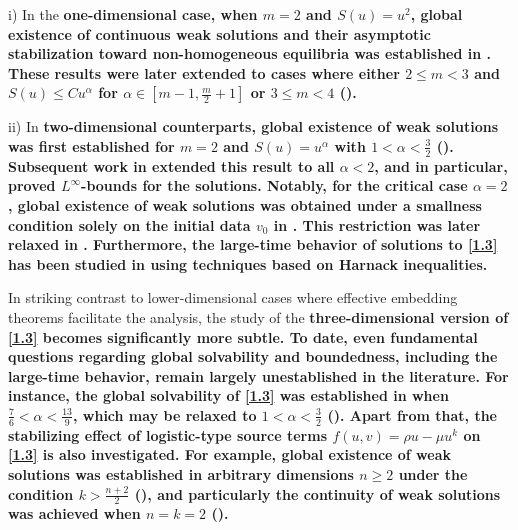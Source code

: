 \documentclass[12pt]{article}
\theoremstyle{plain}
\theoremstyle{definition}
\numberwithin{equation}{section}
\begin{document}
  i)
    In the \bf{one-dimensional} \rm case, when $m=2$ and $S(u)=u^2$, global existence of continuous weak solutions and their asymptotic stabilization toward non-homogeneous equilibria was established in \cite{Winkler3,LiWinkler1}.  These results were later extended to cases where either
    $2\leq m<3$ and $S(u)\leq Cu^{\alpha}$ for
  $\alpha\in[m-1,\frac{m}{2}+1]$ or $3\leq m<4$ (\cite{Wu}).

 ii) In \bf two-dimensional \rm counterparts,   global existence of weak solutions was first established  for $m=2$ and $S(u)=u^{\alpha}$ with  $1<\alpha<\frac{3}{2}$  (\cite{LiG}).  Subsequent work in \cite{WJDE}   extended this result to all  $\alpha<2$, and in particular, proved $L^{\infty}$-bounds for the solutions.  Notably, for the critical case
  $\alpha=2$, global existence of weak solutions was obtained under a smallness condition solely on the initial data $v_0$ in \cite{WNARWA}. This restriction was later  relaxed in \cite{LiYu}. Furthermore, the large-time behavior of solutions to
  \eqref{1.3}  has been studied in \cite{Wu1, Winkler5}  using techniques based on Harnack inequalities.

   In striking contrast to lower-dimensional cases where effective embedding theorems facilitate the analysis,  the study of the \bf{three-dimensional} \rm  version of \eqref{1.3} becomes significantly more subtle. To date, even fundamental questions regarding global solvability and boundedness, including the large-time behavior, remain largely unestablished in the literature.
 For instance,  the global solvability of \eqref{1.3}
    was established in \cite{LiG} when $\frac{7}{6}<\alpha<\frac{13}{9}$, which may be relaxed to $1<\alpha<\frac{3}{2}$
     (\cite{Wu}).
     Apart from that, the stabilizing effect of logistic-type source terms $f(u,v)=\rho u-\mu u^k$ on \eqref{1.3} is also investigated. For example, global existence of weak solutions was established
       in arbitrary dimensions $n\geq2$ under the
 condition  $k>\frac{n+2}{2}$ (\cite{XP}), and particularly the continuity of  weak solutions
was achieved when $n=k=2$ (\cite{LiWinkler2}).
\end{document}
